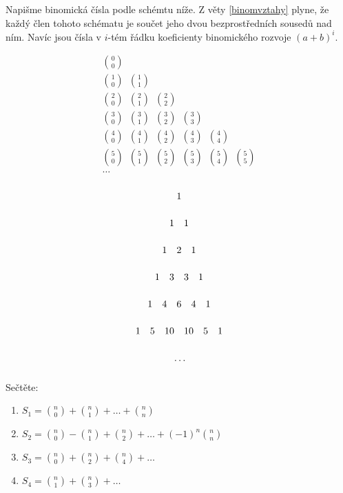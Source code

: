 \begin{pozn}
    Napišme binomická čísla podle schémtu níže. Z věty \ref{binomvztahy} plyne,
    že každý člen tohoto schématu je součet jeho dvou bezprostředních sousedů nad ním.
    Navíc jsou čísla v $i$-tém řádku koeficienty binomického rozvoje $(a+b)^i.$

    \begin{minipage}{0.48\textwidth}
        \begin{gather*}
            \binom{0}{0} \\
            \binom{1}{0} \,\,\, \binom{1}{1} \\
            \binom{2}{0} \,\,\, \binom{2}{1} \,\,\, \binom{2}{2} \\
            \binom{3}{0} \,\,\, \binom{3}{1} \,\,\, \binom{3}{2} \,\,\, \binom{3}{3} \\
            \binom{4}{0} \,\,\, \binom{4}{1} \,\,\, \binom{4}{2} \,\,\, \binom{4}{3} \,\,\, \binom{4}{4} \\
            \binom{5}{0} \,\,\, \binom{5}{1} \,\,\, \binom{5}{2} \,\,\, \binom{5}{3} \,\,\, \binom{5}{4} \,\,\, \binom{5}{5} \\
            \dots
        \end{gather*}
    \end{minipage}
    \hfill
    \begin{minipage}{0.48\textwidth}
    \begin{gather*}
        1\vphantom{\binom{a}{a}} \\
        1\vphantom{\binom{a}{a}} \,\,\,\,\,\, 1 \\
        1\vphantom{\binom{a}{a}} \,\,\,\,\,\, 2 \,\,\,\,\,\, 1 \\
        1\vphantom{\binom{a}{a}} \,\,\,\,\,\, 3 \,\,\,\,\,\, 3 \,\,\,\,\,\, 1 \\
        1\vphantom{\binom{a}{a}} \,\,\,\,\,\, 4 \,\,\,\,\,\, 6 \,\,\,\,\,\, 4 \,\,\,\,\,\, 1 \\
        1\vphantom{\binom{a}{a}} \,\,\,\,\,\, 5 \,\,\,\,\,\, 10 \,\,\,\,\,\, 10 \,\,\,\,\,\, 5 \,\,\,\,\,\, 1 \\
        \vphantom{\binom{a}{a}}\dots
    \end{gather*}
    \end{minipage}


\end{pozn}

\begin{priklad}
Sečtěte:
\begin{enumerate}[$i$]
\item $S_1 = \binom{n}{0}+\binom{n}{1}+\dots+\binom{n}{n}$
\item $S_2= \binom{n}{0}-\binom{n}{1}+\binom{n}{2}+\dots+(-1)^n\binom{n}{n}$
\item $S_3= \binom{n}{0}+\binom{n}{2}+\binom{n}{4}+\dots$
\item $S_4= \binom{n}{1}+\binom{n}{3}+\dots$
\end{enumerate}
\end{priklad}

